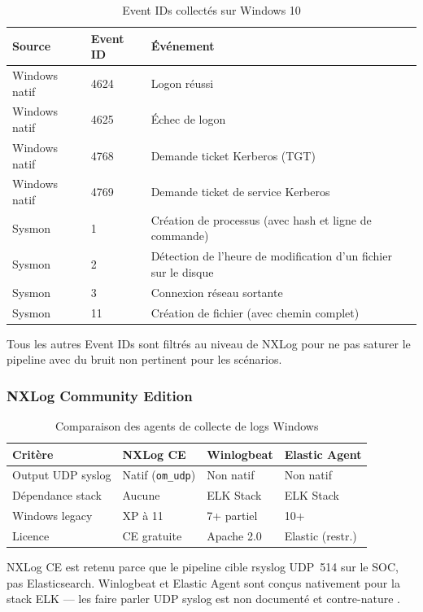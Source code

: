 \documentclass[12pt,a4paper]{article}
\begin{document}
\begin{table}[H]
\centering
\caption{Event IDs collectés sur Windows 10}
\label{tab:eventids}
\begin{tabularx}{\textwidth}{|l|l|X|}
\hline
\textbf{Source} & \textbf{Event ID} & \textbf{Événement} \\
\hline
Windows natif & 4624 & Logon réussi \\
Windows natif & 4625 & Échec de logon \\
Windows natif & 4768 & Demande ticket Kerberos (TGT) \\
Windows natif & 4769 & Demande ticket de service Kerberos \\
Sysmon & 1  & Création de processus (avec hash et ligne de commande) \\
Sysmon & 2  & Détection de l'heure de modification d'un fichier sur le disque\\
Sysmon & 3  & Connexion réseau sortante \\
Sysmon & 11 & Création de fichier (avec chemin complet) \\
\hline
\end{tabularx}
\end{table}

Tous les autres Event IDs sont filtrés au niveau de NXLog pour ne pas
saturer le pipeline avec du bruit non pertinent pour les scénarios.

\subsubsection{NXLog Community Edition}

\begin{table}[H]
\centering
\caption{Comparaison des agents de collecte de logs Windows}
\label{tab:nxlog}
\begin{tabularx}{\textwidth}{|l|X|X|X|}
\hline
\textbf{Critère} & \textbf{NXLog CE} & \textbf{Winlogbeat} & \textbf{Elastic Agent} \\
\hline
Output UDP syslog & Natif (\texttt{om\_udp}) & Non natif & Non natif \\
Dépendance stack  & Aucune & ELK Stack & ELK Stack \\
Windows legacy    & XP à 11 & 7+ partiel & 10+ \\
Licence           & CE gratuite & Apache 2.0 & Elastic (restr.) \\
\hline
\end{tabularx}
\end{table}

NXLog CE est retenu parce que le pipeline cible rsyslog UDP~514 sur le
SOC, pas Elasticsearch. Winlogbeat et Elastic Agent sont conçus nativement
pour la stack ELK --- les faire parler UDP syslog est non documenté et
contre-nature \cite{nxlog_docs}.
\end{document}
